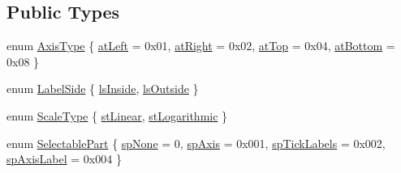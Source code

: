 \subsection*{Public Types}
\begin{DoxyCompactItemize}
\item 
enum \mbox{\hyperlink{class_q_c_p_axis_ae2bcc1728b382f10f064612b368bc18a}{Axis\+Type}} \{ \mbox{\hyperlink{class_q_c_p_axis_ae2bcc1728b382f10f064612b368bc18aaf84aa6cac6fb6099f54a2cbf7546b730}{at\+Left}} = 0x01, 
\mbox{\hyperlink{class_q_c_p_axis_ae2bcc1728b382f10f064612b368bc18aadf5509f7d29199ef2f263b1dd224b345}{at\+Right}} = 0x02, 
\mbox{\hyperlink{class_q_c_p_axis_ae2bcc1728b382f10f064612b368bc18aac0ece2b680d3f545e701f75af1655977}{at\+Top}} = 0x04, 
\mbox{\hyperlink{class_q_c_p_axis_ae2bcc1728b382f10f064612b368bc18aa220d68888516b6c3b493d144f1ba438f}{at\+Bottom}} = 0x08
 \}
\item 
enum \mbox{\hyperlink{class_q_c_p_axis_a24b13374b9b8f75f47eed2ea78c37db9}{Label\+Side}} \{ \mbox{\hyperlink{class_q_c_p_axis_a24b13374b9b8f75f47eed2ea78c37db9aae7b027ac2839cf4ad611df30236fc3f}{ls\+Inside}}, 
\mbox{\hyperlink{class_q_c_p_axis_a24b13374b9b8f75f47eed2ea78c37db9a2eadb509fc0c9a8b35b85c86ec9f3c7a}{ls\+Outside}}
 \}
\item 
enum \mbox{\hyperlink{class_q_c_p_axis_a36d8e8658dbaa179bf2aeb973db2d6f0}{Scale\+Type}} \{ \mbox{\hyperlink{class_q_c_p_axis_a36d8e8658dbaa179bf2aeb973db2d6f0aff6e30a11a828bc850caffab0ff994f6}{st\+Linear}}, 
\mbox{\hyperlink{class_q_c_p_axis_a36d8e8658dbaa179bf2aeb973db2d6f0abf5b785ad976618816dc6f79b73216d4}{st\+Logarithmic}}
 \}
\item 
enum \mbox{\hyperlink{class_q_c_p_axis_abee4c7a54c468b1385dfce2c898b115f}{Selectable\+Part}} \{ \mbox{\hyperlink{class_q_c_p_axis_abee4c7a54c468b1385dfce2c898b115fae0df8123a5528d5ccf87cb7794f971ea}{sp\+None}} = 0, 
\mbox{\hyperlink{class_q_c_p_axis_abee4c7a54c468b1385dfce2c898b115fa8949d2c1a31eccae9be7ed32e7a1ae38}{sp\+Axis}} = 0x001, 
\mbox{\hyperlink{class_q_c_p_axis_abee4c7a54c468b1385dfce2c898b115fa584e0a3dc4d064880647619f4bd4e771}{sp\+Tick\+Labels}} = 0x002, 
\mbox{\hyperlink{class_q_c_p_axis_abee4c7a54c468b1385dfce2c898b115fa851e0600e0d08b4f5fee9361e3fedabd}{sp\+Axis\+Label}} = 0x004
 \}
\end{DoxyCompactItemize}
